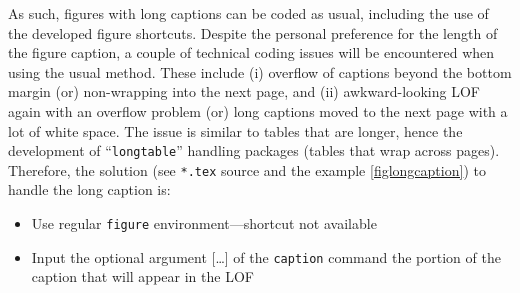 \documentclass[phd]{ndsu-thesis-2022}
\begin{document}
As such, figures with long captions can be coded as usual, including the use of the developed figure shortcuts. Despite the personal preference for the length of the figure caption, a couple of technical coding issues will be encountered when using the usual method. These include (i) overflow of captions beyond the bottom margin (or) non-wrapping into the next page, and (ii) awkward-looking LOF again with an overflow problem (or) long captions moved to the next page with a lot of white space. The issue is similar to tables that are longer, hence the development of ``\texttt{longtable}'' handling packages (tables that wrap across pages). Therefore, the solution (see \texttt{*.tex} source and the example \cref{figlongcaption}) to handle the long caption is:

\begin{itemize}
\item Use regular \texttt{figure} environment---shortcut not available
\item Input the optional argument [\ldots] of the \texttt{caption} command the portion of the caption that will appear in the LOF
\end{itemize}
\end{document}
